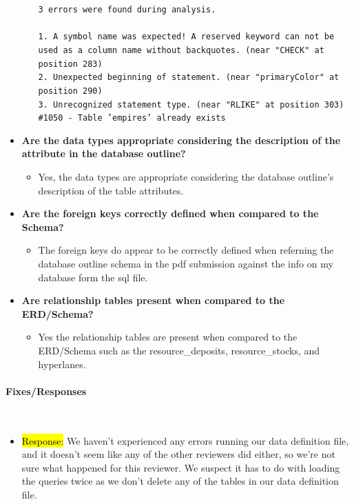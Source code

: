 \documentclass[12pt]{article}
\newcommand{\hiparagraph}[1]{\paragraph{#1}\mbox{}\vspace{-2em}\\}
\DeclareRobustCommand{\response}[1]{{\sethlcolor{ResponseRed}\hl{Response:} #1}}
\begin{document}
\begin{appendices}
\begin{itemize}
\begin{itemize}
        \texttt{3 errors were found during analysis.
            \\ \\
            1. A symbol name was expected! A reserved keyword can not be used as a column name without backquotes. (near "CHECK" at position 283) \\
            2. Unexpected beginning of statement. (near "primaryColor" at position 290) \\
            3. Unrecognized statement type. (near "RLIKE" at position 303) \\
            \#1050 - Table 'empires' already exists}
    \end{itemize}
    \item \textbf{Are the data types appropriate considering the description of the attribute in the database outline?}
    \begin{itemize}
        \item Yes, the data types are appropriate considering the database outline’s description of the table attributes.
    \end{itemize}
    \item \textbf{Are the foreign keys correctly defined when compared to the Schema?}
    \begin{itemize}
        \item The foreign keys do appear to be correctly defined when referning the database outline schema in the pdf submission against the info on my database form the sql file.
    \end{itemize}
    \item \textbf{Are relationship tables present when compared to the ERD/Schema?}
    \begin{itemize}
        \item Yes the relationship tables are present when compared to the ERD/Schema such as the resource\_deposits, resource\_stocks, and hyperlanes.
    \end{itemize}
\end{itemize}
\hiparagraph{Fixes/Responses}
\begin{itemize}
    \item \response{We haven't experienced any errors running our data definition file, and it doesn't seem like any of the other reviewers did either, so we're not sure what happened for this reviewer. We suspect it has to do with loading the queries twice as we don't delete any of the tables in our data definition file.}
\end{itemize}


\end{appendices}
\end{document}
